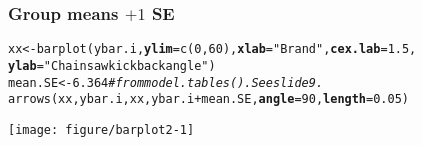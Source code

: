 \documentclass[color=usenames,dvipsnames]{beamer}\usepackage[]{graphicx}\usepackage[]{color}
\makeatletter
\newcommand{\hlnum}[1]{\textcolor[rgb]{0.69,0.494,0}{#1}}%
\newcommand{\hlstr}[1]{\textcolor[rgb]{0.749,0.012,0.012}{#1}}%
\newcommand{\hlcom}[1]{\textcolor[rgb]{0.514,0.506,0.514}{\textit{#1}}}%
\newcommand{\hlopt}[1]{\textcolor[rgb]{0,0,0}{#1}}%
\newcommand{\hlstd}[1]{\textcolor[rgb]{0,0,0}{#1}}%
\newcommand{\hlkwb}[1]{\textcolor[rgb]{0,0.341,0.682}{#1}}%
\newcommand{\hlkwc}[1]{\textcolor[rgb]{0,0,0}{\textbf{#1}}}%
\newcommand{\hlkwd}[1]{\textcolor[rgb]{0.004,0.004,0.506}{#1}}%
\newenvironment{kframe}{%
 \def\at@end@of@kframe{}%
 \ifinner\ifhmode%
  \def\at@end@of@kframe{\end{minipage}}%
  \begin{minipage}{\columnwidth}%
 \fi\fi%
 \def\FrameCommand##1{\hskip\@totalleftmargin \hskip-\fboxsep
 \colorbox{shadecolor}{##1}\hskip-\fboxsep
     \hskip-\linewidth \hskip-\@totalleftmargin \hskip\columnwidth}%
 \MakeFramed {\advance\hsize-\width
   \@totalleftmargin\z@ \linewidth\hsize
   \@setminipage}}%
 {\par\unskip\endMakeFramed%
 \at@end@of@kframe}
\newenvironment{knitrout}{}{} %
\makeatother
\begin{document}
\begin{frame}[fragile]
  \frametitle{Group means $+1$ SE}
\begin{knitrout}\scriptsize
{}\color{fgcolor}\begin{kframe}
\begin{alltt}
\hlstd{xx} \hlkwb{<-} \hlkwd{barplot}\hlstd{(ybar.i,} \hlkwc{ylim}\hlstd{=}\hlkwd{c}\hlstd{(}\hlnum{0}\hlstd{,} \hlnum{60}\hlstd{),} \hlkwc{xlab}\hlstd{=}\hlstr{"Brand"}\hlstd{,} \hlkwc{cex.lab}\hlstd{=}\hlnum{1.5}\hlstd{,}
              \hlkwc{ylab}\hlstd{=}\hlstr{"Chainsaw kickback angle"}\hlstd{)}
\hlstd{mean.SE} \hlkwb{<-} \hlnum{6.364} \hlcom{# from model.tables(). See slide 9.}
\hlkwd{arrows}\hlstd{(xx, ybar.i, xx, ybar.i}\hlopt{+}\hlstd{mean.SE,} \hlkwc{angle}\hlstd{=}\hlnum{90}\hlstd{,} \hlkwc{length}\hlstd{=}\hlnum{0.05}\hlstd{)}
\end{alltt}
\end{kframe}
\end{knitrout}
\vspace{-.1cm}
\begin{center}
  \texttt{[image: figure/barplot2-1]} %
\end{center}
\end{frame}












\end{document}

